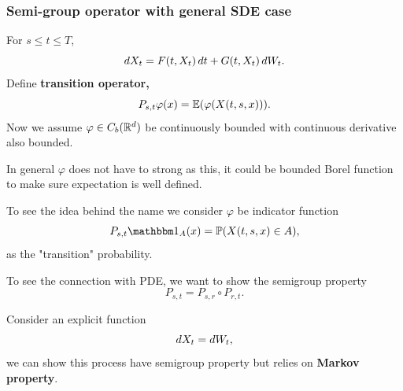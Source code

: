 \subsubsection{Semi-group operator with general SDE case}
For $s\leq t\leq T$,
\begin{equation*}
    \mathop{}\!d X_t = F(t,X_t) \mathop{}\!d t + G(t,X_t) \mathop{}\!d W_t.
\end{equation*}
Define \textbf{transition operator,}
\begin{equation*}
    P_{s,t}\varphi(x) = \mathbb{E}(\varphi(X(t,s,x))).
\end{equation*} 
Now we assume $\varphi \in C_b(\mathbb{R}^d)$ be continuously bounded with continuous derivative also bounded.

\begin{rem}
In general $\varphi$ does not have to strong as this, it could be bounded Borel function to make sure expectation is well defined.
\end{rem}
To see the idea behind the name we consider $\varphi$ be indicator function
\begin{equation*}
    P_{s,t} \I{A}(x) = \prob(X(t,s,x) \in A),
\end{equation*} 
as the "transition" probability.


To see the connection with PDE, we want to show the semigroup property
\begin{equation*}
    P_{s,t} = P_{s,r} \circ P_{r,t}.
\end{equation*}

\begin{example}
Consider an explicit function
\begin{equation*}
    \mathop{}\!d X_t = \mathop{}\!d W_t,
\end{equation*}
we can show this process have semigroup property but relies on \textbf{Markov property}.
\end{example}

